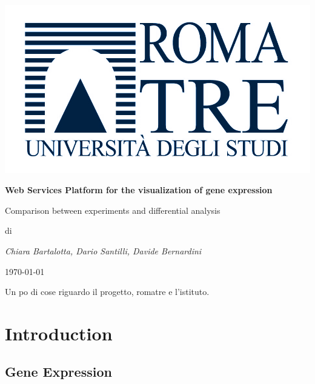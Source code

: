 \documentclass[a4paper]{report}
\begin{document}
\begin{titlepage}
\centering
{}
\includegraphics{logoRomaTre.jpg}\\
{\LARGE \bf Web Services Platform for the visualization of gene expression\par}
\vspace{0.5cm}
{\Large Comparison between experiments and differential analysis\par} 
\vspace{2cm}
di\\
{\Large \em Chiara Bartalotta, Dario Santilli, Davide Bernardini\par}
\date{\currenttime}
\today
\end{titlepage}

\begin{Large}
Un po di cose riguardo il progetto, romatre e l'istituto.\\
\end{Large}

\tableofcontents

\part{Introduction}
\chapter{Gene Expression}
\end{document}
